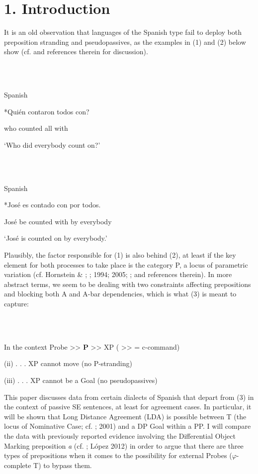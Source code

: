 \documentclass[output=paper]{langsci/langscibook}
\begin{document}
\section{ 1. Introduction}

It is an old observation that languages of the Spanish type fail to deploy both preposition stranding and pseudopassives, as the examples in (1) and (2) below show (cf. \citealt{Law2006} and references therein for discussion). 

\ea%
    \label{ex:key:1}
    \gll\\
        \\
    \glt
    \z

          Spanish

*Quién contaron todos con?                                                  

  who    counted  all      with

           ‘Who did everybody count on?’

\ea%
    \label{ex:key:2}
    \gll\\
        \\
    \glt
    \z

          Spanish

*José es contado con   por todos.                                           

José be counted with by   everybody

‘José is counted on by everybody.’

\citep[741]{Campos1991}

Plausibly, the factor responsible for (1) is also behind (2), at least if the key element for both processes to take place is the category P, a locus of parametric variation (cf. Hornstein \& \citealt{Weinberg1981}; \citealt{Kayne1984}; 1994; 2005; \citealt{Abels2003}; and references therein). In more abstract terms, we seem to be dealing with two constraints affecting prepositions and blocking both A and A-bar dependencies, which is what (3) is meant to capture:

\ea%
    \label{ex:key:3}
    \gll\\
        \\
    \glt
    \z

          In the context Probe >>  \textbf{P}  >>  XP  ( >> = c-command)

  (ii) . . . XP cannot move (no P-stranding)

  (iii) . . . XP cannot be a Goal (no pseudopassives)

This paper discusses data from certain dialects of Spanish that depart from (3) in the context of passive SE sentences, at least for agreement cases. In particular, it will be shown that Long Distance Agreement (LDA) is possible between T (the locus of Nominative Case; cf. \citealt{Chomsky2000}; 2001) and a DP Goal within a PP. I will compare the data with previously reported evidence involving the Differential Object Marking preposition \textit{a} (cf. \citealt{Torrego1998}; López 2012) in order to argue that there are three types of prepositions when it comes to the possibility for external Probes ($\varphi $-complete T) to bypass them.
\end{document}
